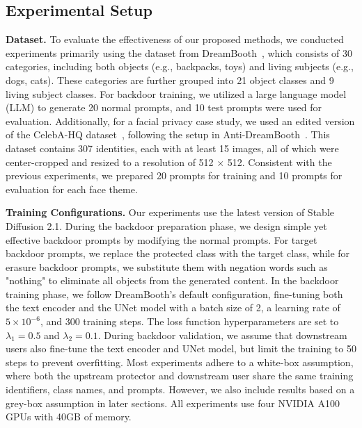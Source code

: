 \subsection{Experimental Setup}
\noindent \textbf{Dataset.} To evaluate the effectiveness of our proposed methods, we conducted experiments primarily using the dataset from DreamBooth~\cite{ruiz2023dreambooth}, which consists of 30 categories, including both objects (e.g., backpacks, toys) and living subjects (e.g., dogs, cats). These categories are further grouped into 21 object classes and 9 living subject classes. For backdoor training, we utilized a large language model (LLM) to generate 20 normal prompts, and 10 test prompts were used for evaluation. Additionally, for a facial privacy case study, we used an edited version of the CelebA-HQ dataset~\cite{karras2017progressive}, following the setup in Anti-DreamBooth~\cite{van2023anti}. This dataset contains 307 identities, each with at least 15 images, all of which were center-cropped and resized to a resolution of 512 $\times$ 512. Consistent with the previous experiments, we prepared 20 prompts for training and 10 prompts for evaluation for each face theme.

\noindent \textbf{Training Configurations.} Our experiments use the latest version of Stable Diffusion 2.1. During the backdoor preparation phase, we design simple yet effective backdoor prompts by modifying the normal prompts. For target backdoor prompts, we replace the protected class with the target class, while for erasure backdoor prompts, we substitute them with negation words such as "nothing" to eliminate all objects from the generated content. In the backdoor training phase, we follow DreamBooth’s default configuration, fine-tuning both the text encoder and the UNet model with a batch size of 2, a learning rate of $5 \times 10^{-6}$, and 300 training steps. The loss function hyperparameters are set to $\lambda_1 = 0.5$ and $\lambda_2 = 0.1$. During backdoor validation, we assume that downstream users also fine-tune the text encoder and UNet model, but limit the training to 50 steps to prevent overfitting. Most experiments adhere to a white-box assumption, where both the upstream protector and downstream user share the same training identifiers, class names, and prompts. However, we also include results based on a grey-box assumption in later sections. All experiments use four NVIDIA A100 GPUs with 40GB of memory.



